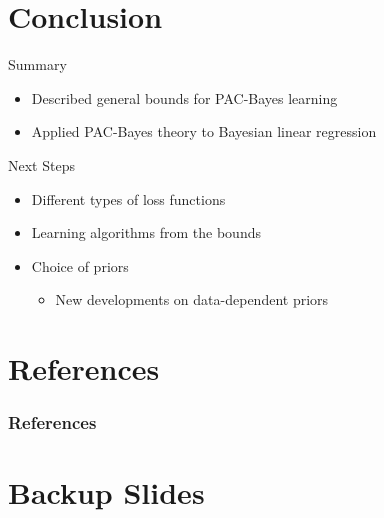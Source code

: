 \documentclass[aspectratio=169]{beamer}
\begin{document}
\section{Conclusion}

\begin{frame}{Summary}
	\begin{itemize}
		\item
      Described general bounds for PAC-Bayes learning
    \item
      Applied PAC-Bayes theory to Bayesian linear regression
	\end{itemize}
\end{frame}

\begin{frame}{Next Steps}
  \begin{itemize}
    \item
      Different types of loss functions
    \item
      Learning algorithms from the bounds
    \item
      Choice of priors
      \begin{itemize}
        \item
          New developments on data-dependent priors
      \end{itemize}
  \end{itemize}
\end{frame}

\section{References}

\begin{frame}[allowframebreaks]
  \frametitle{References}
  \nocite{*}
  
  
\end{frame}

\section{Backup Slides}
\end{document}
